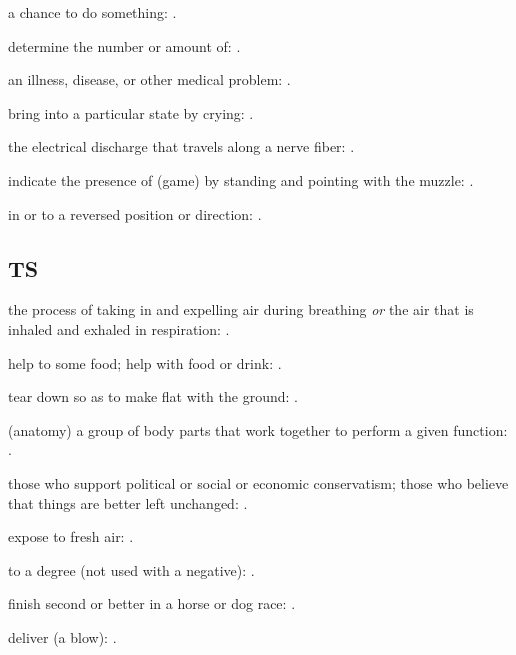   a chance to do something:   .

  determine the number or amount of:   .

  an illness, disease, or other medical problem: .

  bring into a particular state by crying: .

  the electrical discharge that travels along a nerve fiber:   .

  indicate the presence of (game) by standing and pointing with the muzzle: .

  in or to a reversed position or direction:   .

\subsection*{TS}

  the process of taking in and expelling air during breathing \textit{or} the air that is inhaled and exhaled in respiration: .

  help to some food; help with food or drink:   .

  tear down so as to make flat with the ground:   .

  (anatomy) a group of body parts that work together to perform a given function: .

  those who support political or social or economic conservatism; those who believe that things are better left unchanged:   .

  expose to fresh air:   .

  to a degree (not used with a negative):   .

  finish second or better in a horse or dog race: .

  deliver (a blow): .

